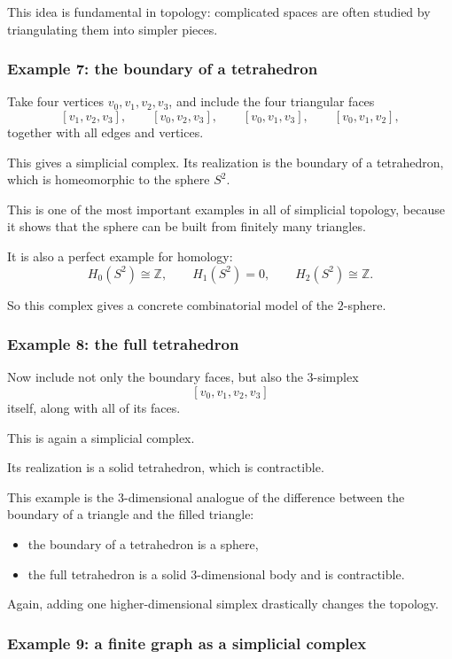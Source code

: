 \documentclass[12pt,a4paper]{article}
\theoremstyle{notespace}
\begin{document}
This idea is fundamental in topology: complicated spaces are often studied by triangulating them into simpler pieces.

\subsubsection{Example 7: the boundary of a tetrahedron}

Take four vertices \(v_0,v_1,v_2,v_3\), and include the four triangular faces
\[
[v_1,v_2,v_3],\qquad
[v_0,v_2,v_3],\qquad
[v_0,v_1,v_3],\qquad
[v_0,v_1,v_2],
\]
together with all edges and vertices.

This gives a simplicial complex. Its realization is the boundary of a tetrahedron, which is homeomorphic to the sphere \(S^2\).

This is one of the most important examples in all of simplicial topology, because it shows that the sphere can be built from finitely many triangles.

It is also a perfect example for homology:
\[
H_0(S^2)\cong \mathbb{Z},\qquad
H_1(S^2)=0,\qquad
H_2(S^2)\cong \mathbb{Z}.
\]

So this complex gives a concrete combinatorial model of the \(2\)-sphere.

\subsubsection{Example 8: the full tetrahedron}

Now include not only the boundary faces, but also the \(3\)-simplex
\[
[v_0,v_1,v_2,v_3]
\]
itself, along with all of its faces.

This is again a simplicial complex.

Its realization is a solid tetrahedron, which is contractible.

This example is the \(3\)-dimensional analogue of the difference between the boundary of a triangle and the filled triangle:
\begin{itemize}
	\item the boundary of a tetrahedron is a sphere,
	\item the full tetrahedron is a solid \(3\)-dimensional body and is contractible.
\end{itemize}

Again, adding one higher-dimensional simplex drastically changes the topology.

\subsubsection{Example 9: a finite graph as a simplicial complex}
\end{document}
